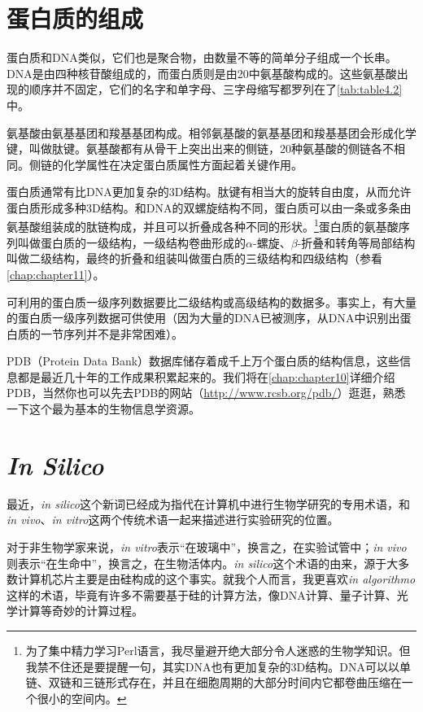 \section{蛋白质的组成}
  蛋白质和DNA类似，它们也是聚合物，由数量不等的简单分子组成一个长串。DNA是由四种核苷酸组成的，而蛋白质则是由20中氨基酸构成的。这些氨基酸出现的顺序并不固定，它们的名字和单字母、三字母缩写都罗列在了\autoref{tab:table4.2}中。

氨基酸由氨基基团和羧基基团构成。相邻氨基酸的氨基基团和羧基基团会形成化学键，叫做肽键。氨基酸都有从骨干上突出出来的侧链，20种氨基酸的侧链各不相同。侧链的化学属性在决定蛋白质属性方面起着关键作用。

蛋白质通常有比DNA更加复杂的3D结构。肽键有相当大的旋转自由度，从而允许蛋白质形成多种3D结构。和DNA的双螺旋结构不同，蛋白质可以由一条或多条由氨基酸组装成的肽链构成，并且可以折叠成各种不同的形状。\footnote{为了集中精力学习Perl语言，我尽量避开绝大部分令人迷惑的生物学知识。但我禁不住还是要提醒一句，其实DNA也有更加复杂的3D结构。DNA可以以单链、双链和三链形式存在，并且在细胞周期的大部分时间内它都卷曲压缩在一个很小的空间内。}蛋白质的氨基酸序列叫做蛋白质的一级结构，一级结构卷曲形成的$\alpha$-螺旋、$\beta$-折叠和转角等局部结构叫做二级结构，最终的折叠和组装叫做蛋白质的三级结构和四级结构（参看\autoref{chap:chapter11}）。

可利用的蛋白质一级序列数据要比二级结构或高级结构的数据多。事实上，有大量的蛋白质一级序列数据可供使用（因为大量的DNA已被测序，从DNA中识别出蛋白质的一节序列并不是非常困难）。

PDB（Protein Data
Bank）数据库储存着成千上万个蛋白质的结构信息，这些信息都是最近几十年的工作成果积累起来的。我们将在\autoref{chap:chapter10}详细介绍PDB，当然你也可以先去PDB的网站（\href{http://www.rcsb.org/pdb/}{http://www.rcsb.org/pdb/}）逛逛，熟悉一下这个最为基本的生物信息学资源。

\section{\textit{In Silico}}
  最近，\textit{in silico}这个新词已经成为指代在计算机中进行生物学研究的专用术语，和\textit{in vivo}、\textit{in vitro}这两个传统术语一起来描述进行实验研究的位置。

  对于非生物学家来说，\textit{in vitro}表示“在玻璃中”，换言之，在实验试管中；\textit{in vivo}则表示“在生命中”，换言之，在生物活体内。\textit{in silico}这个术语的由来，源于大多数计算机芯片主要是由硅构成的这个事实。就我个人而言，我更喜欢\textit{in algorithmo}这样的术语，毕竟有许多不需要基于硅的计算方法，像DNA计算、量子计算、光学计算等奇妙的计算过程。

